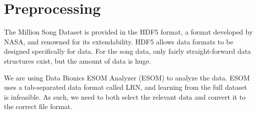 \section{Preprocessing} %
\label{sec:preprocessing}

The Million Song Dataset is provided in the HDF5 format, a format developed by NASA, and renowned for its extendability. HDF5
allows data formats to be designed specifically for data. For the song data, only fairly straight-forward data structures exist,
but the amount of data is huge.

We are using Data Bionics ESOM Analyzer (ESOM) to analyze the data. ESOM uses a tab-separated data format called LRN, and learning
from the full dataset is infeasible. As such, we need to both select the relevant data and convert it to the correct file format.


